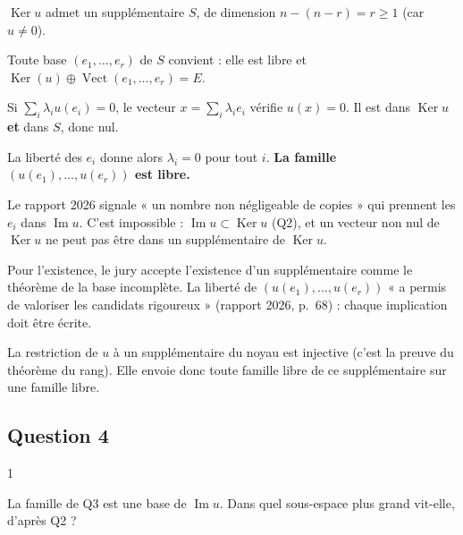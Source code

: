 \documentclass[11pt,a4paper]{article}
\begin{document}
\(\operatorname{Ker}u\) admet un supplémentaire \(S\), de dimension \(n-(n-r)=r\ge1\) (car \(u\neq0\)).

Toute base \((e_1,\dots,e_r)\) de \(S\) convient : elle est libre et \(\operatorname{Ker}(u)\oplus\operatorname{Vect}(e_1,\allowbreak \dots,\allowbreak e_r)=E\).

Si \(\sum_i\lambda_iu(e_i)=0\), le vecteur \(x=\sum_i\lambda_ie_i\) vérifie \(u(x)=0\). Il est dans \(\operatorname{Ker}u\) \textbf{et} dans \(S\), donc nul.

La liberté des \(e_i\) donne alors \(\lambda_i=0\) pour tout \(i\). \textbf{La famille \((u(e_1),\dots,u(e_r))\) est libre.}

\begin{piege}

Le rapport 2026 signale « un nombre non négligeable de copies » qui prennent les \(e_i\) dans \(\operatorname{Im}u\). C'est impossible : \(\operatorname{Im}u\subset\operatorname{Ker}u\) (Q2), et un vecteur non nul de \(\operatorname{Ker}u\) ne peut pas être dans un supplémentaire de \(\operatorname{Ker}u\).

\end{piege}

\begin{jury}

Pour l'existence, le jury accepte l'existence d'un supplémentaire comme le théorème de la base incomplète. La liberté de \((u(e_1),\dots,u(e_r))\) « a permis de valoriser les candidats rigoureux » (rapport 2026, p.~68) : chaque implication doit être écrite.

\end{jury}

\begin{methode}

La restriction de \(u\) à un supplémentaire du noyau est injective (c'est la preuve du théorème du rang). Elle envoie donc toute famille libre de ce supplémentaire sur une famille libre.

\end{methode}

\hypertarget{question-4}{%
\subsection{Question 4}\label{question-4}}

\begin{indication}{1}

La famille de Q3 est une base de \(\operatorname{Im}u\). Dans quel sous-espace plus grand vit-elle, d'après Q2 ?

\end{indication}
\end{document}
